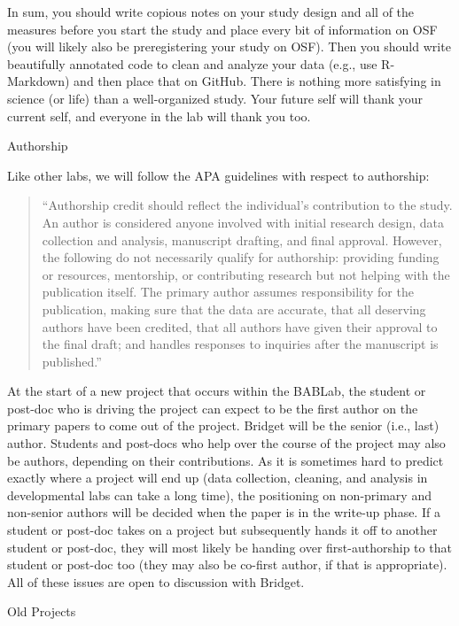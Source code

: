 \documentclass[]{book}
\begin{document}
In sum, you should write copious notes on your study design and all of the measures before you start the study and place every bit of information on OSF (you will likely also be preregistering your study on OSF). Then you should write beautifully annotated code to clean and analyze your data (e.g., use R-Markdown) and then place that on GitHub. There is nothing more satisfying in science (or life) than a well-organized study. Your future self will thank your current self, and everyone in the lab will thank you too.

Authorship

Like other labs, we will follow the APA guidelines with respect to authorship:

\begin{quote}
``Authorship credit should reflect the individual's contribution to the study. An author is considered anyone involved with initial research design, data collection and analysis, manuscript drafting, and final approval. However, the following do not necessarily qualify for authorship: providing funding or resources, mentorship, or contributing research but not helping with the publication itself. The primary author assumes responsibility for the publication, making sure that the data are accurate, that all deserving authors have been credited, that all authors have given their approval to the final draft; and handles responses to inquiries after the manuscript is published.''
\end{quote}

At the start of a new project that occurs within the BABLab, the student or post-doc who is driving the project can expect to be the first author on the primary papers to come out of the project. Bridget will be the senior (i.e., last) author. Students and post-docs who help over the course of the project may also be authors, depending on their contributions. As it is sometimes hard to predict exactly where a project will end up (data collection, cleaning, and analysis in developmental labs can take a long time), the positioning on non-primary and non-senior authors will be decided when the paper is in the write-up phase. If a student or post-doc takes on a project but subsequently hands it off to another student or post-doc, they will most likely be handing over first-authorship to that student or post-doc too (they may also be co-first author, if that is appropriate). All of these issues are open to discussion with Bridget.

Old Projects
\end{document}
